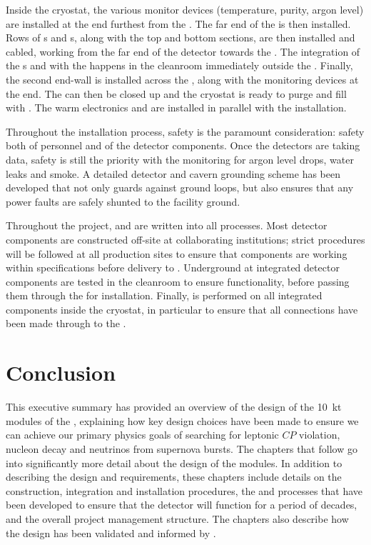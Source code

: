 Inside the cryostat, the various monitor devices (temperature, purity, argon level) are installed at the end furthest from the . The far end of the  is then installed. Rows of s and s, along with the top and bottom  sections, are then installed and cabled, working from the far end of the detector towards the . The integration of the s and  with the  happens in the cleanroom immediately outside the . Finally, the second  end-wall is installed across the , along with the monitoring devices at the  end. The  can then be closed up and the cryostat is ready to purge and fill with . The warm electronics and  are installed in parallel with the  installation.

Throughout the installation process, safety is the paramount consideration: safety both of personnel and of the detector components. Once the detectors are taking data, safety is still the priority with the  monitoring for argon level drops, water leaks and smoke. A detailed detector and cavern grounding scheme has been developed that not only guards against ground loops, but also ensures that any power faults are safely shunted to the facility ground.

Throughout the project,  and  are written into all processes. Most detector components are constructed off-site at collaborating institutions; strict  procedures will be followed at all production sites to ensure that components are working within specifications before delivery to . Underground at  integrated detector components are tested in the cleanroom to ensure functionality, before passing them through the  for installation. Finally,  is performed on all integrated components inside the cryostat, in particular to ensure that all connections have been made through to the .

\section{Conclusion}
\label{sec:fdsp-exec-conclusion}

This executive summary has provided an overview of the design of the \SI{10}{\kilo\tonne}   modules of the  , explaining how key design choices have been made to ensure we can achieve our primary physics goals of searching for leptonic $CP$ violation, nucleon decay and neutrinos from supernova bursts. The chapters that follow go into significantly more detail about the design of the   modules. In addition to describing the design and requirements, these chapters include details on the construction, integration and installation procedures, the  and  processes that have been developed to ensure that the detector will function for a period of decades, and the overall project management structure. The chapters also describe how the design has been validated and informed by .

